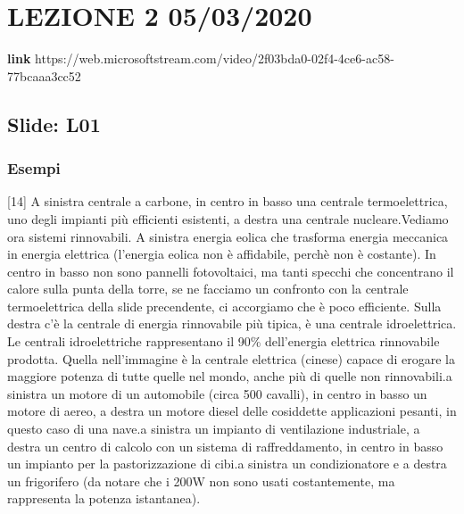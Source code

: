 \section{LEZIONE 2 05/03/2020}
\textbf{link} https://web.microsoftstream.com/video/2f03bda0-02f4-4ce6-ac58-77bcaaa3cc52
\subsection{Slide: L01}
\subsubsection{Esempi}
[14] A sinistra centrale a carbone, in centro in basso una centrale termoelettrica, uno degli impianti più efficienti esistenti, a destra una centrale nucleare.\newline
[15] Vediamo ora sistemi rinnovabili. A sinistra energia eolica che trasforma energia meccanica in energia elettrica (l'energia eolica non è affidabile, perchè non è costante). In centro in basso non sono pannelli fotovoltaici, ma tanti specchi che concentrano il calore sulla punta della torre, se ne facciamo un confronto con la centrale termoelettrica della slide precendente, ci accorgiamo che è poco efficiente. Sulla destra c'è la centrale di energia rinnovabile più tipica, è una centrale idroelettrica. Le centrali idroelettriche rappresentano il 90\% dell'energia elettrica rinnovabile prodotta. Quella nell'immagine è la centrale elettrica (cinese) capace di erogare la maggiore potenza di tutte quelle nel mondo, anche più di quelle non rinnovabili.\newline
[16] a sinistra un motore di un automobile (circa 500 cavalli), in centro in basso un motore di aereo, a destra un motore diesel delle cosiddette applicazioni pesanti, in questo caso di una nave.\newline
[17] a sinistra un impianto di ventilazione industriale, a destra un centro di calcolo con un sistema di raffreddamento, in centro in basso un impianto per la pastorizzazione di cibi.\newline
[18] a sinistra un condizionatore e a destra un frigorifero (da notare che i 200W non sono usati costantemente, ma rappresenta la potenza istantanea).\newline
